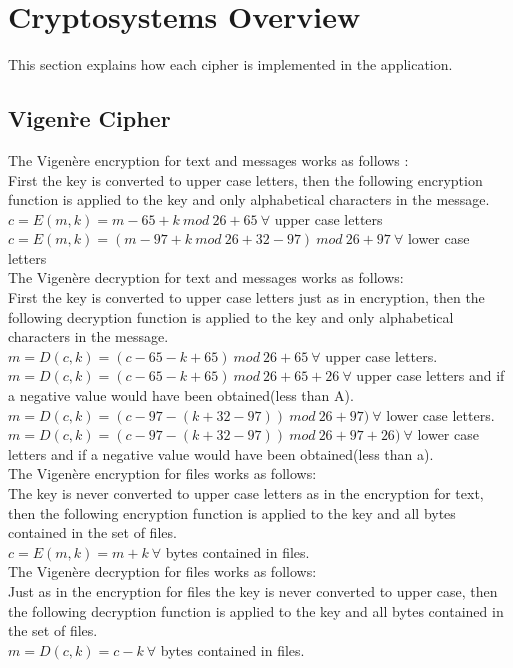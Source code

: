 \documentclass[11pt]{article}
\begin{document}
	\section{Cryptosystems Overview}
	This section explains how each cipher is implemented in the application.
	\subsection{Vigen\`re Cipher}
	The Vigen\`ere encryption for text and messages works as follows \cite{bruen2011cryptography}:\\
	First the key is converted to upper case letters, then the following encryption function is applied to the key and only alphabetical characters in the message.\\
	$c = E(m, k) = m - 65 + k\ mod\ 26 + 65\ \forall$ upper case letters\\
	$c = E(m, k) = (m - 97 + k \ mod \ 26 + 32 - 97)\ mod\ 26 + 97\ \forall$ lower case letters\\

	The Vigen\`ere decryption for text and messages works as follows:\\
	First the key is converted to upper case letters just as in encryption, then the following decryption function is applied to the key and only alphabetical characters in the message.\\
	$m = D(c, k) = (c - 65 - k + 65)\ mod\ 26 + 65\ \forall$ upper case letters.\\
	$m = D(c, k) = (c - 65 - k + 65)\ mod\ 26 + 65 + 26\ \forall$ upper case letters and if a negative value would have been obtained(less than A).\\
		$m = D(c, k) = (c - 97 - (k + 32 - 97)) \ mod \ 26 + 97)\ \forall$ lower case letters.\\
	$m = D(c, k) = (c - 97 - (k + 32 - 97)) \ mod \ 26 + 97 + 26)\ \forall$ lower case letters and if a negative value would have been obtained(less than a).\\

	The Vigen\`ere encryption for files works as follows:\\
	The key is never converted to upper case letters as in the encryption for text, then the following encryption function is applied to the key and all bytes contained in the set of files.\\
	$c = E(m, k) = m + k\ \forall$ bytes contained in files.\\

	The Vigen\`ere decryption for files works as follows:\\
	Just as in the encryption for files the key is never converted to upper case, then the following decryption function is applied to the key and all bytes contained in the set of files.\\
	$m = D(c, k) = c - k\ \forall$ bytes contained in files.\\
\end{document}
